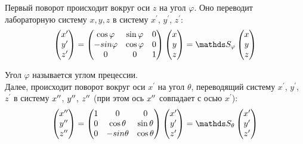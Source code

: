 Первый поворот происходит вокруг оси $z$ на угол $\varphi$. Оно переводит лабораторную систему $x, y, z$ в систему $x^\prime$, $y^\prime$, $z^\prime$: 
\begin{gather}
\begin{pmatrix}
x^\prime \\
y^\prime \\
z^\prime
\end{pmatrix} = 
\begin{pmatrix}
\cos \varphi & \sin \varphi & 0 \\
- sin \varphi & \cos \varphi & 0 \\
0 & 0 & 1
\end{pmatrix}
\begin{pmatrix}
x \\
y \\
z
\end{pmatrix} =
\bbS_\varphi
\begin{pmatrix}
x \\
y \\
z
\end{pmatrix} \notag
\end{gather}

Угол $\varphi$ называется углом прецессии.\\

\hspace{0.48cm} Далее, происходит поворот вокруг оси $x^\prime$ на угол $\theta$, переводящий систему $x^\prime$, $y^\prime$, $z^\prime$ в систему $x^{\prime \prime}$, $y^{\prime \prime}$, $z^{\prime \prime}$ (при этом ось $x^{\prime \prime}$ совпадает с осью $x^{\prime}$):
\begin{gather}
\begin{pmatrix}
x^{\dpr} \\
y^{\dpr} \\
z^{\dpr} 
\end{pmatrix} = 
\begin{pmatrix}
1 & 0 & 0 \\
0 & \cos \theta & \sin \theta \\
0 & - sin \theta & \cos \theta
\end{pmatrix}
\begin{pmatrix}
x^\prime \\
y^\prime \\
z^\prime
\end{pmatrix} = 
\bbS_\theta
\begin{pmatrix}
x^\prime \\
y^\prime \\
z^\prime
\end{pmatrix} \notag
\end{gather}   


